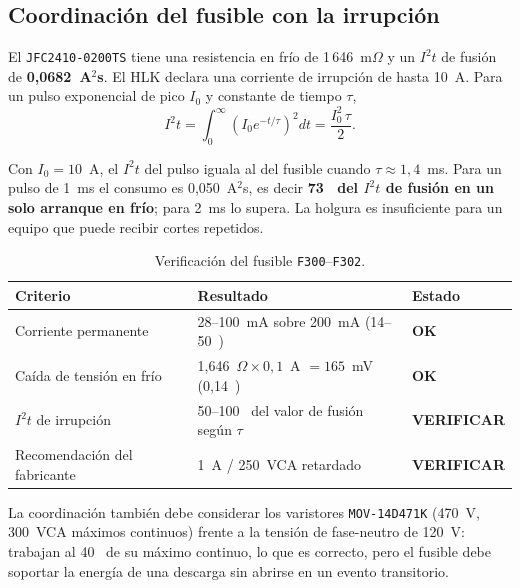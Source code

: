 \documentclass[11pt,a4paper]{article}
\newcommand{\pct}{\text{\char37}}
\newcommand{\ok}{\textcolor{ok}{\textbf{OK}}}
\newcommand{\revisar}{\textcolor{warn}{\textbf{VERIFICAR}}}
\begin{document}
\subsection{Coordinación del fusible con la irrupción}

\begin{samepage}
El \texttt{JFC2410-0200TS} tiene una resistencia en frío de 1\,646~m$\Omega$ y
un $I^2t$ de fusión de \textbf{0,0682~A$^2$s}. El HLK declara una corriente de
irrupción de hasta 10~A. Para un pulso exponencial de pico $I_0$ y constante de
tiempo $\tau$,
\begin{equation}
I^2t = \int_0^\infty \left(I_0 e^{-t/\tau}\right)^2 dt = \frac{I_0^2\,\tau}{2}.
\end{equation}
\end{samepage}

Con $I_0 = 10$~A, el $I^2t$ del pulso iguala al del fusible cuando
$\tau \approx 1{,}4$~ms. Para un pulso de 1~ms el consumo es 0,050~A$^2$s, es
decir \textbf{73~\pct{} del $I^2t$ de fusión en un solo arranque en frío}; para
2~ms lo supera. La holgura es insuficiente para un equipo que puede recibir
cortes repetidos.

\begin{table}[H]
\centering
\caption{Verificación del fusible \texttt{F300}--\texttt{F302}.}
\label{tab:fusible}
\small
\begin{tabularx}{\textwidth}{@{}l X l@{}}
\toprule
\textbf{Criterio} & \textbf{Resultado} & \textbf{Estado} \\
\midrule
Corriente permanente & 28--100~mA sobre 200~mA (14--50~\pct) & \ok \\
Caída de tensión en frío & 1,646~$\Omega \times 0{,}1$~A $= 165$~mV (0,14~\pct) & \ok \\
$I^2t$ de irrupción & 50--100~\pct{} del valor de fusión según $\tau$ & \revisar \\
Recomendación del fabricante & 1~A / 250~VCA retardado & \revisar \\
\bottomrule
\end{tabularx}
\end{table}

\noindent La coordinación también debe considerar los varistores
\texttt{MOV-14D471K} (470~V, 300~VCA máximos continuos) frente a la tensión de
fase-neutro de 120~V: trabajan al 40~\pct{} de su máximo continuo, lo que es
correcto, pero el fusible debe soportar la energía de una descarga sin abrirse
en un evento transitorio.

\end{document}
